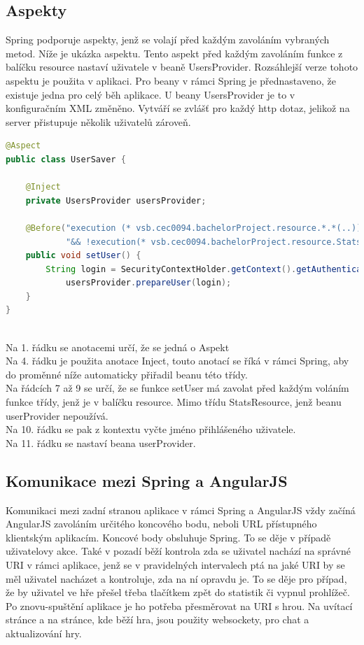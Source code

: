 \documentclass[czech,master,public,dept460,male,cpdeclaration,twoside]{diploma}
\begin{document}
\subsection{Aspekty}
Spring podporuje aspekty, jenž se volají před každým zavoláním vybraných metod. Níže je ukázka aspektu. Tento aspekt před každým zavoláním funkce z balíčku resource nastaví uživatele v beaně UsersProvider. Rozsáhlejší verze tohoto aspektu je použita v aplikaci. Pro beany v rámci Spring je přednastaveno, že existuje jedna pro celý běh aplikace. U beany UsersProvider je to v konfiguračním XML změněno. Vytváří se zvlášť pro každý http dotaz, jelikož na server přistupuje několik uživatelů zároveň. \\

\begin{lstlisting}[language=Java,label=src:Java, caption=Ukázka aspektu]
@Aspect
public class UserSaver {

    @Inject
    private UsersProvider usersProvider;

    @Before("execution (* vsb.cec0094.bachelorProject.resource.*.*(..))" +
            "&& !execution(* vsb.cec0094.bachelorProject.resource.StatsResource.*(..))")
    public void setUser() {
        String login = SecurityContextHolder.getContext().getAuthentication().getName();
            usersProvider.prepareUser(login);
    }
}
\end{lstlisting}
~\\
Na 1. řádku se anotacemi určí, že se jedná o Aspekt\\
Na 4. řádku je použita anotace Inject, touto anotací se říká v rámci Spring, aby do proměnné níže automaticky přiřadil beanu této třídy.\\
Na řádcích 7 až 9 se určí, že se funkce setUser má zavolat před každým voláním funkce třídy, jenž je v balíčku resource. Mimo třídu StatsResource, jenž beanu userProvider nepoužívá.\\
Na 10. řádku se pak z kontextu vyčte jméno přihlášeného uživatele.\\
Na 11. řádku se nastaví beana userProvider.

\subsection{Komunikace mezi Spring a AngularJS}
Komunikaci mezi zadní stranou aplikace v rámci Spring a AngularJS vždy začíná AngularJS zavoláním určitého koncového bodu, neboli URL přístupného klientským aplikacím. Koncové body obsluhuje Spring. To se děje v případě uživatelovy akce. Také v pozadí běží kontrola zda se uživatel nachází na správné URI v rámci aplikace, jenž se v pravidelných intervalech ptá na jaké URI by se měl uživatel nacházet a kontroluje, zda na ní opravdu je. To se děje pro případ, že by uživatel ve hře přešel třeba tlačítkem zpět do statistik či vypnul prohlížeč. Po znovu-spuštění aplikace je ho potřeba přesměrovat na URI s hrou. Na uvítací stránce a na stránce, kde běží hra, jsou použity websockety, pro chat a aktualizování hry.
\end{document}
